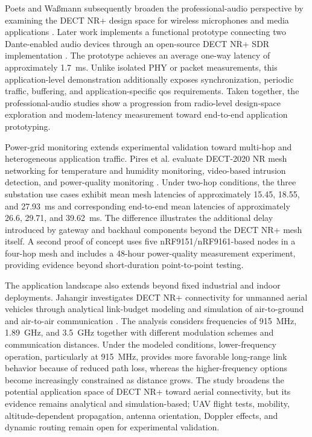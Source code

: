 Poets and Wa{\ss}mann subsequently broaden the professional-audio perspective by examining the DECT NR+ design space for wireless microphones and media applications \cite{poetsDECTNRNew2024}. Later work implements a functional prototype connecting two Dante-enabled audio devices through an open-source DECT NR+ SDR implementation \cite{poetsProfessionalNetworkedAudio2025}. The prototype achieves an average one-way latency of approximately 1.7~ms. Unlike isolated PHY or packet measurements, this application-level demonstration additionally exposes synchronization, periodic traffic, buffering, and application-specific \gls{qos} requirements. Taken together, the professional-audio studies show a progression from radio-level design-space exploration and modem-latency measurement toward end-to-end application prototyping.

Power-grid monitoring extends experimental validation toward multi-hop and heterogeneous application traffic. Pires et al. evaluate DECT-2020 NR mesh networking for temperature and humidity monitoring, video-based intrusion detection, and power-quality monitoring \cite{piresDECT2020NREnergy2026b}. Under two-hop conditions, the three substation use cases exhibit mean mesh latencies of approximately 15.45, 18.55, and 27.93~ms and corresponding end-to-end mean latencies of approximately 26.6, 29.71, and 39.62~ms. The difference illustrates the additional delay introduced by gateway and backhaul components beyond the DECT NR+ mesh itself. A second proof of concept uses five nRF9151/nRF9161-based nodes in a four-hop mesh and includes a 48-hour power-quality measurement experiment, providing evidence beyond short-duration point-to-point testing.

The application landscape also extends beyond fixed industrial and indoor deployments. Jahangir investigates DECT NR+ connectivity for unmanned aerial vehicles through analytical link-budget modeling and simulation of air-to-ground and air-to-air communication \cite{jahangirAnalysisPerformanceDECT2024}. The analysis considers frequencies of 915~MHz, 1.89~GHz, and 3.5~GHz together with different modulation schemes and communication distances. Under the modeled conditions, lower-frequency operation, particularly at 915~MHz, provides more favorable long-range link behavior because of reduced path loss, whereas the higher-frequency options become increasingly constrained as distance grows. The study broadens the potential application space of DECT NR+ toward aerial connectivity, but its evidence remains analytical and simulation-based; UAV flight tests, mobility, altitude-dependent propagation, antenna orientation, Doppler effects, and dynamic routing remain open for experimental validation.

